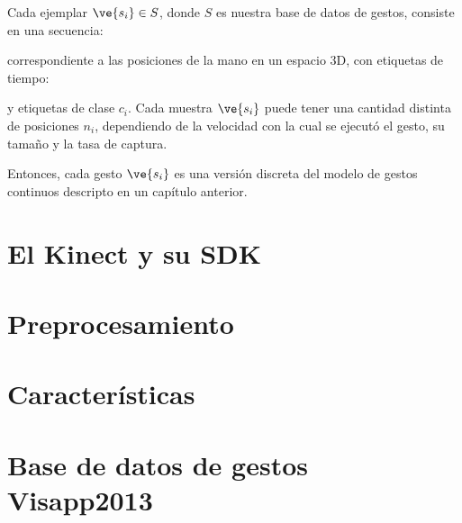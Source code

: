 Cada ejemplar $\ve{s_i} \in S$, donde $S$ es nuestra base de datos de gestos, consiste en una secuencia:


correspondiente a las posiciones de la mano en un espacio 3D, con etiquetas de tiempo:


y etiquetas de clase $c_i$. Cada muestra $\ve{s_i}$ puede tener una cantidad distinta de posiciones $n_i$, dependiendo de la velocidad con la cual se ejecutó el gesto, su tamaño y la tasa de captura.

Entonces, cada gesto $\ve{s_i}$ es una versión discreta del modelo de gestos continuos descripto en un capítulo anterior.

\section{El Kinect y su SDK}

\section{Preprocesamiento}

\section{Características}

\section{Base de datos de gestos Visapp2013 }
